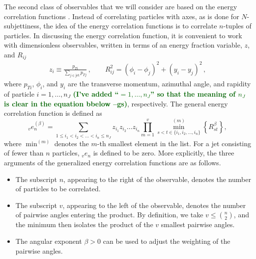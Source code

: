 \documentclass[11pt,letterpaper]{article}
\DeclareRobustCommand{\Ref}[1]{Ref.~\cite{#1}}
\newcommand{\ecfvar}[3]{{_{#1}e_{#2}^{(#3)}}}
\newcommand{\ecfvarnobeta}[2]{{_{#1}e_{#2}}}
\newcommand{\gs}[1]{\textbf{\textcolor{darkgreen}{(#1 --gs)}}}
\begin{document}
The second class of observables that we will consider are based on the energy correlation functions \cite{Larkoski:2013eya}. Instead of correlating particles with axes, as is done for $N$-subjettiness, the idea of the energy correlation functions is to correlate $n$-tuples of particles.  In discussing the energy correlation function, it is convenient to work with dimensionless observables, written in terms of an energy fraction variable, $z$, and $R_{ij}$
\begin{align}\label{eq:ptratio}  
z_i\equiv\frac{p_{Ti}}{\sum_{j \in \text{jet}} p_{Tj}}\,, \qquad   R_{ij}^2 = (\phi_i-\phi_j)^2+(y_i-y_j)^2\,,
\end{align}
where $p_{Ti}$, $\phi_i$, and $y_i$ are the transverse momentum,
azimuthal angle, and rapidity of particle $i=1,\dots,n_J$ \gs{I've
  added ``$=1,\dots,n_J$'' so that the meaning of $n_J$ is clear in
  the equation bbelow}, respectively. 
The general energy correlation function is defined as
\begin{equation}\label{eq:ecf_gen}
\ecfvar{v}{n}{\beta} = \sum_{1 \leq i_1 < i_2 < \dots < i_n \leq n_J} z_{i_1} z_{i_2} \dots z_{i_n} \prod_{m = 1}^{v} \min^{(m)}_{s < t \in \{i_1, i_2 , \dots, i_n \}} \left\{ R_{st}^{\beta} \right\},
\end{equation}
where $\min^{(m)}$ denotes the $m$-th smallest element in the list.  For a jet consisting of fewer than $n$ particles, $\ecfvarnobeta{v}{n}$ is defined to be zero.  More explicitly, the three arguments of the generalized energy correlation functions are as follows.
\begin{itemize}
\item The subscript $n$, appearing to the right of the observable, denotes the number of particles to be correlated.   
\item The subscript $v$, appearing to the left of the observable, denotes the number of pairwise angles entering the product.  By definition, we take $v \leq \binom{n}{2}$, and the minimum then isolates the product of the $v$ smallest pairwise angles.
\item The angular exponent $\beta>0$ can be used to adjust the weighting of the pairwise angles.
\end{itemize}
\end{document}
